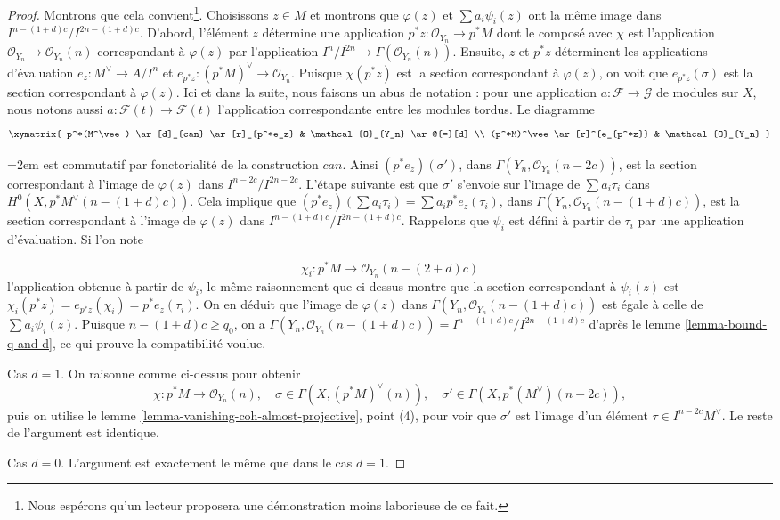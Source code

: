 \begin{proof}
\medskip\noindent
Montrons que cela convient\footnote{Nous espérons qu'un lecteur proposera une démonstration moins laborieuse de ce fait.}. Choisissons $z \in M$ et montrons que $\varphi(z)$ et $\sum a_i \psi_i(z)$ ont la même image dans $I^{n - (1 + d)c}/I^{2n - (1 + d)c}$. D'abord, l'élément $z$ détermine une application $p^*z : \mathcal{O}_{Y_n} \to p^*M$ dont le composé avec $\chi$ est l'application $\mathcal{O}_{Y_n} \to \mathcal{O}_{Y_n}(n)$ correspondant à $\varphi(z)$ par l'application $I^n/I^{2n} \to \Gamma(\mathcal{O}_{Y_n}(n))$. Ensuite, $z$ et $p^*z$ déterminent les applications d'évaluation $e_z : M^\vee \to A/I^n$ et $e_{p^*z} : (p^*M)^\vee \to \mathcal{O}_{Y_n}$. Puisque $\chi(p^*z)$ est la section correspondant à $\varphi(z)$, on voit que $e_{p^*z}(\sigma)$ est la section correspondant à $\varphi(z)$. Ici et dans la suite, nous faisons un abus de notation : pour une application $a : \mathcal{F} \to \mathcal{G}$ de modules sur $X$, nous notons aussi $a : \mathcal{F}(t) \to \mathcal{F}(t)$ l'application correspondante entre les modules tordus. Le diagramme
$$
\xymatrix{
p^*(M^\vee) \ar[d]_{can} \ar[r]_{p^*e_z} & \mathcal{O}_{Y_n} \ar@{=}[d] \\
(p^*M)^\vee \ar[r]^{e_{p^*z}} & \mathcal{O}_{Y_n}
}
$$
{\emergencystretch=2em
est commutatif par fonctorialité de la construction $can$. Ainsi $(p^*e_z)(\sigma')$, dans $\Gamma(Y_n, \mathcal{O}_{Y_n}(n - 2c))$, est la section correspondant à l'image de $\varphi(z)$ dans $I^{n - 2c}/I^{2n - 2c}$. L'étape suivante est que $\sigma'$ s'envoie sur l'image de $\sum a_i \tau_i$ dans $H^0(X, p^*M^\vee(n - (1 + d)c))$. Cela implique que $(p^*e_z)(\sum a_i \tau_i) = \sum a_i p^*e_z(\tau_i)$, dans $\Gamma(Y_n, \mathcal{O}_{Y_n}(n - (1 + d)c))$, est la section correspondant à l'image de $\varphi(z)$ dans $I^{n - (1 + d)c}/I^{2n - (1 + d)c}$. Rappelons que $\psi_i$ est défini à partir de $\tau_i$ par une application d'évaluation. Si l'on note
\par}
$$
\chi_i : p^*M \longrightarrow \mathcal{O}_{Y_n}(n - (2 + d)c)
$$
l'application obtenue à partir de $\psi_i$, le même raisonnement que ci-dessus montre que la section correspondant à $\psi_i(z)$ est $\chi_i(p^*z) = e_{p^*z}(\chi_i) = p^*e_z(\tau_i)$. On en déduit que l'image de $\varphi(z)$ dans $\Gamma(Y_n, \mathcal{O}_{Y_n}(n - (1 + d)c))$ est égale à celle de $\sum a_i\psi_i(z)$. Puisque $n - (1 + d)c \geq q_0$, on a $\Gamma(Y_n, \mathcal{O}_{Y_n}(n - (1 + d)c)) =
I^{n - (1 + d)c}/I^{2n - (1 + d)c}$ d'après le lemme \ref{lemma-bound-q-and-d}, ce qui prouve la compatibilité voulue.

\medskip\noindent
Cas $d = 1$. On raisonne comme ci-dessus pour obtenir
$$
\chi : p^*M \longrightarrow \mathcal{O}_{Y_n}(n),\quad
\sigma \in \Gamma(X, (p^*M)^\vee(n)),\quad
\sigma' \in \Gamma(X, p^*(M^\vee)(n - 2c)),
$$
puis on utilise le lemme \ref{lemma-vanishing-coh-almost-projective}, point (4), pour voir que $\sigma'$ est l'image d'un élément $\tau \in I^{n - 2c}M^\vee$. Le reste de l'argument est identique.

\medskip\noindent
Cas $d = 0$. L'argument est exactement le même que dans le cas $d = 1$.
\end{proof}

